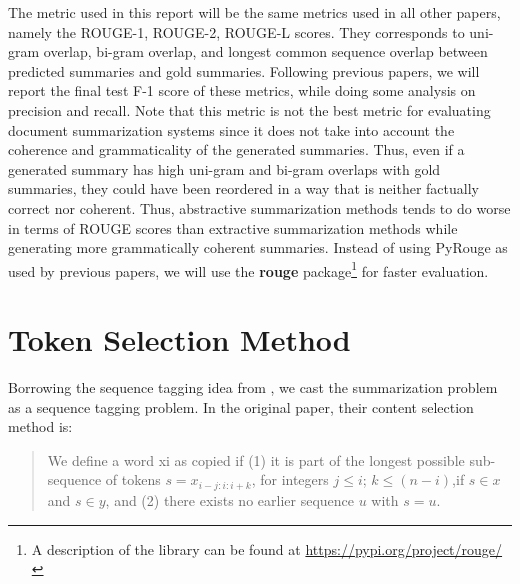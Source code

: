 \documentclass[11pt,a4paper]{article}
\begin{document}
The metric used in this report will be the same metrics used in all other papers, namely the ROUGE-1, ROUGE-2, ROUGE-L scores. They corresponds to uni-gram overlap, bi-gram overlap, and longest common sequence overlap between predicted summaries and gold summaries. Following previous papers, we will report the final test F-1 score of these metrics, while doing some analysis on precision and recall. Note that this metric is not the best metric for evaluating document summarization systems since it does not take into account the coherence and grammaticality of the generated summaries. Thus, even if a generated summary has high uni-gram and bi-gram overlaps with gold summaries, they could have been reordered in a way that is neither factually correct nor coherent. Thus, abstractive summarization methods tends to do worse in terms of ROUGE scores than extractive summarization methods while generating more grammatically coherent summaries. Instead of using PyRouge as used by previous papers, we will use the \textbf{rouge} package\footnote{A description of the library can be found at \url{https://pypi.org/project/rouge/}} for faster evaluation.


\section{Token Selection Method}
Borrowing the sequence tagging idea from \citet{bottom-up}, we cast the summarization problem as a sequence tagging problem. In the original paper, their content selection method is:
\begin{quote}
	We define a word xi as copied if (1) it is part of the longest possible sub-sequence of tokens $s = x_{i-j:i:i+k}$, for integers $j \leq i$; $k \leq (n-i)$,if $s \in x$ and  $s \in y$, and (2) there exists no earlier sequence $u$ with $s = u$.
\end{quote}
\end{document}
